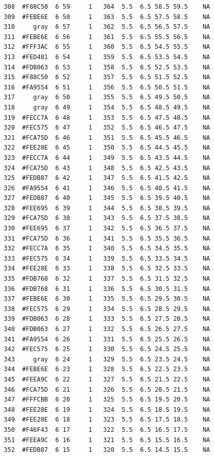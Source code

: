 \documentclass[12pt,twoside]{reedthesis}
\begin{document}
\begin{verbatim}
  308  #F88C50  6 59     1   364  5.5  6.5 58.5 59.5    NA
  309  #FEBE6E  6 58     1   363  5.5  6.5 57.5 58.5    NA
  310     gray  6 57     1   362  5.5  6.5 56.5 57.5    NA
  311  #FEBE6E  6 56     1   361  5.5  6.5 55.5 56.5    NA
  312  #FFF3AC  6 55     1   360  5.5  6.5 54.5 55.5    NA
  313  #FED481  6 54     1   359  5.5  6.5 53.5 54.5    NA
  314  #FDB063  6 53     1   358  5.5  6.5 52.5 53.5    NA
  315  #F88C50  6 52     1   357  5.5  6.5 51.5 52.5    NA
  316  #FA9554  6 51     1   356  5.5  6.5 50.5 51.5    NA
  317     gray  6 50     1   355  5.5  6.5 49.5 50.5    NA
  318     gray  6 49     1   354  5.5  6.5 48.5 49.5    NA
  319  #FECC7A  6 48     1   353  5.5  6.5 47.5 48.5    NA
  320  #FEC575  6 47     1   352  5.5  6.5 46.5 47.5    NA
  321  #FCA75D  6 46     1   351  5.5  6.5 45.5 46.5    NA
  322  #FEE28E  6 45     1   350  5.5  6.5 44.5 45.5    NA
  323  #FECC7A  6 44     1   349  5.5  6.5 43.5 44.5    NA
  324  #FCA75D  6 43     1   348  5.5  6.5 42.5 43.5    NA
  325  #FEDB87  6 42     1   347  5.5  6.5 41.5 42.5    NA
  326  #FA9554  6 41     1   346  5.5  6.5 40.5 41.5    NA
  327  #FEDB87  6 40     1   345  5.5  6.5 39.5 40.5    NA
  328  #FEE695  6 39     1   344  5.5  6.5 38.5 39.5    NA
  329  #FCA75D  6 38     1   343  5.5  6.5 37.5 38.5    NA
  330  #FEE695  6 37     1   342  5.5  6.5 36.5 37.5    NA
  331  #FCA75D  6 36     1   341  5.5  6.5 35.5 36.5    NA
  332  #FECC7A  6 35     1   340  5.5  6.5 34.5 35.5    NA
  333  #FEC575  6 34     1   339  5.5  6.5 33.5 34.5    NA
  334  #FEE28E  6 33     1   338  5.5  6.5 32.5 33.5    NA
  335  #FDB768  6 32     1   337  5.5  6.5 31.5 32.5    NA
  336  #FDB768  6 31     1   336  5.5  6.5 30.5 31.5    NA
  337  #FEBE6E  6 30     1   335  5.5  6.5 29.5 30.5    NA
  338  #FEC575  6 29     1   334  5.5  6.5 28.5 29.5    NA
  339  #FDB063  6 28     1   333  5.5  6.5 27.5 28.5    NA
  340  #FDB063  6 27     1   332  5.5  6.5 26.5 27.5    NA
  341  #FA9554  6 26     1   331  5.5  6.5 25.5 26.5    NA
  342  #FEC575  6 25     1   330  5.5  6.5 24.5 25.5    NA
  343     gray  6 24     1   329  5.5  6.5 23.5 24.5    NA
  344  #FEBE6E  6 23     1   328  5.5  6.5 22.5 23.5    NA
  345  #FEEA9C  6 22     1   327  5.5  6.5 21.5 22.5    NA
  346  #FCA75D  6 21     1   326  5.5  6.5 20.5 21.5    NA
  347  #FFFCBB  6 20     1   325  5.5  6.5 19.5 20.5    NA
  348  #FEE28E  6 19     1   324  5.5  6.5 18.5 19.5    NA
  349  #FEE28E  6 18     1   323  5.5  6.5 17.5 18.5    NA
  350  #F46F43  6 17     1   322  5.5  6.5 16.5 17.5    NA
  351  #FEEA9C  6 16     1   321  5.5  6.5 15.5 16.5    NA
  352  #FEDB87  6 15     1   320  5.5  6.5 14.5 15.5    NA

\end{verbatim}
\end{document}
